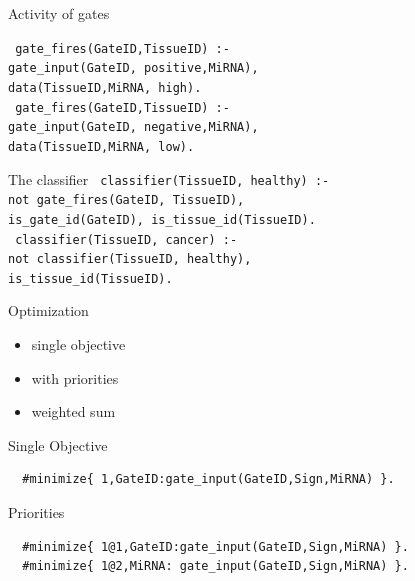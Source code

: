\documentclass[10pt,dvipsnames]{beamer}
\begin{document}
\begin{frame}[fragile]{Activity of gates}

 \texttt{
 gate\_fires(GateID,TissueID) :-\\
   \quad gate\_input(GateID,{\color{red} positive},MiRNA),\\
   \quad data(TissueID,MiRNA,{\color{red} high}).\\
 }
 \vspace{1cm}
 \texttt{
 gate\_fires(GateID,TissueID) :-\\
   \quad gate\_input(GateID,{\color{red} negative},MiRNA),\\
   \quad data(TissueID,MiRNA,{\color{red} low}).
 }
\end{frame}

\begin{frame}{The classifier}
 \texttt{
  classifier(TissueID, healthy) :-\\
    \quad not gate\_fires(GateID, TissueID),\\
    \quad is\_gate\_id(GateID), is\_tissue\_id(TissueID).\\
 }
 \vspace{1cm}
 \texttt{
  classifier(TissueID, cancer) :-\\
    \quad not classifier(TissueID, healthy),\\
    \quad is\_tissue\_id(TissueID).
 }
\end{frame}



\begin{frame}{Optimization}
 \begin{itemize}
  \item single objective
  \item with priorities
  \item weighted sum
 \end{itemize}
\end{frame}

\begin{frame}[fragile]{Single Objective}
 \begin{verbatim}
  #minimize{ 1,GateID:gate_input(GateID,Sign,MiRNA) }.
 \end{verbatim}
\end{frame}

\begin{frame}[fragile]{Priorities}
 \begin{verbatim}
  #minimize{ 1@1,GateID:gate_input(GateID,Sign,MiRNA) }.
  #minimize{ 1@2,MiRNA: gate_input(GateID,Sign,MiRNA) }.
 \end{verbatim}
\end{frame}
\end{document}
